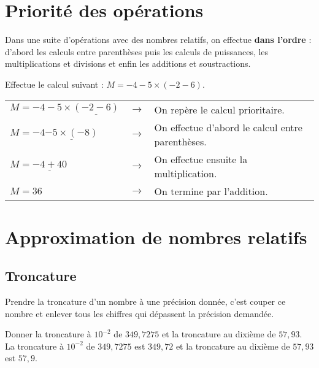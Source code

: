 \section{Priorité des opérations}

\begin{aconnaitre}
Dans une suite d'opérations avec des nombres relatifs, on effectue \textbf{dans l'ordre} : d'abord les calculs entre parenthèses puis les calculs de puissances, les multiplications et divisions et enfin les additions et soustractions.
\end{aconnaitre}


\begin{exemple*1}
Effectue le calcul suivant : $M = -4 -5 \times (-2 -6)$.

\correction

\begin{tabular}{lcl}
$M = -4 -5 \times \underline{(-2 -6)}$ & $\rightarrow$ & On repère le calcul prioritaire. \\
$M = -4 \underline{-5 \times (-8)}$ & $\rightarrow$ & On effectue d'abord le calcul entre parenthèses. \\
$M = \underline{-4 + 40}$ & $\rightarrow$ & On effectue ensuite la multiplication. \\
$M = 36$ & $\rightarrow$ & On termine par l'addition. \\
\end{tabular}
\end{exemple*1}





\section{Approximation de nombres relatifs}

\subsection{Troncature}

\begin{definition}
Prendre la troncature d’un nombre à une précision donnée, c’est couper ce nombre et enlever tous les chiffres qui dépassent la précision demandée.
\end{definition}

\begin{exemple*1}
Donner la troncature à $10^{-2}$ de $349,7275$ et la troncature au dixième de $57,93$.
\correction
La troncature à $10^{-2}$ de $349,7275$ est $349,72$ et la troncature au dixième de $57,93$ est $57,9$.
\end{exemple*1}

